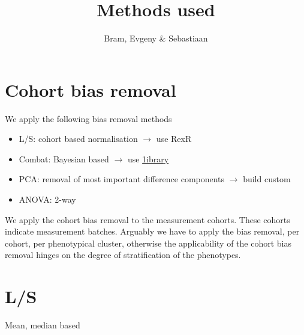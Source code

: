 \documentclass[a4paper,10pt]{article}
\title{Methods used}
\author{Bram, Evgeny \& Sebastiaan}
\begin{document}
\section{Cohort bias removal}
%
We apply the following bias removal methods
%
\begin{itemize}
\item L/S: cohort based normalisation $\rightarrow$ use RexR
\item Combat: Bayesian based $\rightarrow$ use \href{http://www.bu.edu/jlab/wp-assets/ComBat/Abstract.html}{1ibrary} 
\item PCA: removal of most important difference components $\rightarrow$ build custom
\item ANOVA: 2-way 
\end{itemize}

We apply the cohort bias removal to the measurement cohorts. These cohorts indicate measurement batches.
%
Arguably we have to apply the bias removal, per cohort, per phenotypical cluster, otherwise
the applicability of the cohort bias removal hinges on the degree of stratification of the phenotypes.

\section{L/S}
%
Mean, median based




\end{document}
